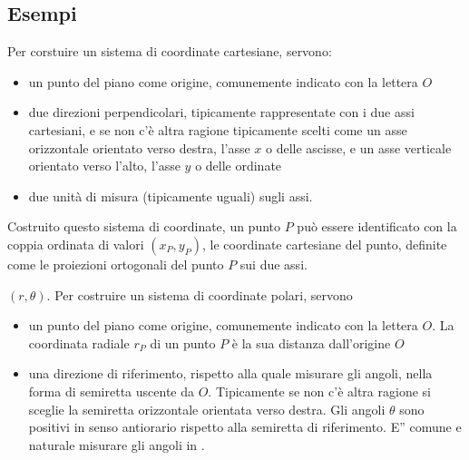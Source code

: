 \documentclass[letterpaper,10pt,italian]{jupyterBook}
\begin{document}
\subsection{Esempi}
\label{\detokenize{ch/analytic_geometry/analytic_geometry_2d/coordinates:esempi}}\label{\detokenize{ch/analytic_geometry/analytic_geometry_2d/coordinates:geometry-analytic-2d-coordinates-examples}}
\sphinxAtStartPar
{} Per corstuire un sistema di coordinate cartesiane, servono:
\begin{itemize}
\item {} 
\sphinxAtStartPar
un punto del piano come origine, comunemente indicato con la lettera \(O\)

\item {} 
\sphinxAtStartPar
due direzioni perpendicolari, tipicamente rappresentate con i due assi cartesiani, e \sphinxhyphen{} se non c’è altra ragione \sphinxhyphen{} tipicamente scelti come un asse orizzontale orientato verso destra, l’asse \(x\) o delle ascisse, e un asse verticale orientato verso l’alto, l’asse \(y\) o delle ordinate

\item {} 
\sphinxAtStartPar
due unità di misura (tipicamente uguali) sugli assi.

\end{itemize}

\sphinxAtStartPar
Costruito questo sistema di coordinate, un punto \(P\) può essere identificato con la coppia ordinata di valori \((x_P, y_P)\), le coordinate cartesiane del punto, definite come le proiezioni ortogonali del punto \(P\) sui due assi.

\sphinxAtStartPar
{} \((r, \theta)\). Per costruire un sistema di coordinate polari, servono
\begin{itemize}
\item {} 
\sphinxAtStartPar
un punto del piano come origine, comunemente indicato con la lettera \(O\). La coordinata radiale \(r_P\) di un punto \(P\) è la sua distanza dall’origine \(O\)

\item {} 
\sphinxAtStartPar
una direzione di riferimento, rispetto alla quale misurare gli angoli, nella forma di semiretta uscente da \(O\). Tipicamente \sphinxhyphen{} se non c’è altra ragione \sphinxhyphen{} si sceglie la semiretta orizzontale orientata verso destra. Gli angoli \(\theta\) sono positivi in senso antiorario rispetto alla semiretta di riferimento. E” comune e naturale misurare gli angoli in .

\end{itemize}
\end{document}
